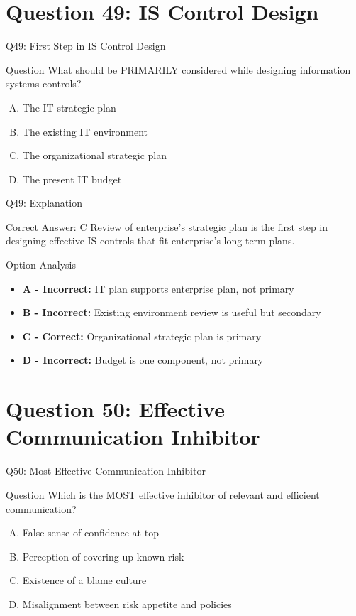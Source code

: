 \documentclass{beamer}
\begin{document}
	\section{Question 49: IS Control Design}
	
	\begin{frame}{Q49: First Step in IS Control Design}
		\begin{block}{Question}
			What should be PRIMARILY considered while designing information systems controls?
		\end{block}
		\begin{enumerate}[(A)]
			\item The IT strategic plan
			\item The existing IT environment
			\item The organizational strategic plan
			\item The present IT budget
		\end{enumerate}
	\end{frame}
	
	\begin{frame}{Q49: Explanation}
		\begin{block}{Correct Answer: C}
			Review of enterprise's strategic plan is the first step in designing effective IS controls that fit enterprise's long-term plans.
		\end{block}
		\begin{block}{Option Analysis}
			\begin{itemize}
				\item \textbf{A - Incorrect:} IT plan supports enterprise plan, not primary
				\item \textbf{B - Incorrect:} Existing environment review is useful but secondary
				\item \textbf{C - Correct:} Organizational strategic plan is primary
				\item \textbf{D - Incorrect:} Budget is one component, not primary
			\end{itemize}
		\end{block}
	\end{frame}
	
	\section{Question 50: Effective Communication Inhibitor}
	
	\begin{frame}{Q50: Most Effective Communication Inhibitor}
		\begin{block}{Question}
			Which is the MOST effective inhibitor of relevant and efficient communication?
		\end{block}
		\begin{enumerate}[(A)]
			\item False sense of confidence at top
			\item Perception of covering up known risk
			\item Existence of a blame culture
			\item Misalignment between risk appetite and policies
		\end{enumerate}
	\end{frame}
	
\end{document}
